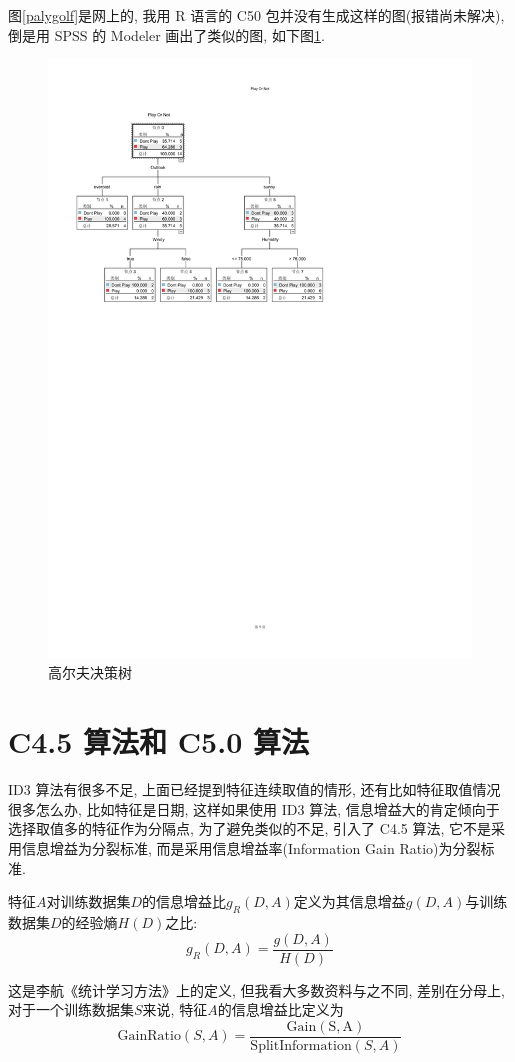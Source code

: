 \documentclass[a4paper,UTF8]{ctexart}
\theoremstyle{plain} \newtheorem{theorem}{定理}[section]
\theoremstyle{plain} \newtheorem{definition}{定义}[section]
\theoremstyle{plain} \newtheorem{lemma}{引理}[section]
\theoremstyle{plain} \newtheorem{proposition}{命题}[section]
\theoremstyle{plain} \newtheorem{example}{例}
\theoremstyle{plain} \newtheorem{remark}{注}
\theoremstyle{plain} \newtheorem{corollary}{推论}[section]
\begin{document}
图\ref{palygolf}是网上的, 我用 R 语言的 C50 包并没有生成这样的图(报错尚未解决), 倒是用 SPSS 的 Modeler 画出了类似的图, 如下图\ref{spss}.
\begin{figure}[!htb]
	\centering
	\includegraphics[width = 0.75 \textwidth]{golf.pdf}
	\caption{高尔夫决策树}
	\label{spss}
\end{figure}



\section{C4.5 算法和 C5.0 算法}
ID3 算法有很多不足, 上面已经提到特征连续取值的情形, 还有比如特征取值情况很多怎么办, 比如特征是日期, 这样如果使用 ID3 算法, 信息增益大的肯定倾向于选择取值多的特征作为分隔点, 为了避免类似的不足, 引入了 C4.5 算法, 它不是采用信息增益为分裂标准, 而是采用信息增益率(Information Gain Ratio)为分裂标准.

特征$A$对训练数据集$D$的信息增益比$g_{R}(D, A)$定义为其信息增益$g(D, A)$与训练数据集$D$的经验熵$H(D)$之比:
\begin{equation*}
g_{R}(D, A) = \frac{g(D, A)}{H(D)}
\end{equation*}

这是李航《统计学习方法》上的定义, 但我看大多数资料与之不同, 差别在分母上, 对于一个训练数据集$S$来说, 特征$A$的信息增益比定义为
\begin{equation*}
\mathrm{GainRatio}(S, A) = \frac{\mathrm{Gain(S, A)}}{\mathrm{SplitInformation}(S, A)}
\end{equation*}
\end{document}
